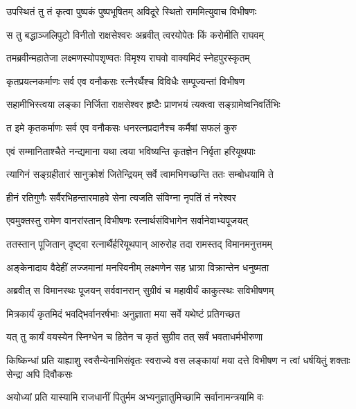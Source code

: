 
\twolineshloka
{उपस्थितं तु तं कृत्वा पुष्पकं पुष्पभूषितम्}
{अविदूरे स्थितो राममित्युवाच विभीषणः} %

\twolineshloka
{स तु बद्धाञ्जलिपुटो विनीतो राक्षसेश्वरः}
{अब्रवीत् त्वरयोपेतः किं करोमीति राघवम्} %

\twolineshloka
{तमब्रवीन्महातेजा लक्ष्मणस्योपशृण्वतः}
{विमृश्य राघवो वाक्यमिदं स्नेहपुरस्कृतम्} %

\twolineshloka
{कृतप्रयत्नकर्माणः सर्व एव वनौकसः}
{रत्नैरर्थैश्च विविधैः सम्पूज्यन्तां विभीषण} %

\twolineshloka
{सहामीभिस्त्वया लङ्का निर्जिता राक्षसेश्वर}
{हृष्टैः प्राणभयं त्यक्त्वा सङ्ग्रामेष्वनिवर्तिभिः} %

\twolineshloka
{त इमे कृतकर्माणः सर्व एव वनौकसः}
{धनरत्नप्रदानैश्च कर्मैषां सफलं कुरु} %

\twolineshloka
{एवं सम्मानिताश्चैते नन्द्यमाना यथा त्वया}
{भविष्यन्ति कृतज्ञेन निर्वृता हरियूथपाः} %

\twolineshloka
{त्यागिनं सङ्ग्रहीतारं सानुक्रोशं जितेन्द्रियम्}
{सर्वे त्वामभिगच्छन्ति ततः सम्बोधयामि ते} %

\twolineshloka
{हीनं रतिगुणैः सर्वैरभिहन्तारमाहवे}
{सेना त्यजति संविग्ना नृपतिं तं नरेश्वर} %

\twolineshloka
{एवमुक्तस्तु रामेण वानरांस्तान् विभीषणः}
{रत्नार्थसंविभागेन सर्वानेवाभ्यपूजयत्} %

\twolineshloka
{ततस्तान् पूजितान् दृष्ट्वा रत्नार्थैर्हरियूथपान्}
{आरुरोह तदा रामस्तद् विमानमनुत्तमम्} %

\twolineshloka
{अङ्केनादाय वैदेहीं लज्जमानां मनस्विनीम्}
{लक्ष्मणेन सह भ्रात्रा विक्रान्तेन धनुष्मता} %

\twolineshloka
{अब्रवीत् स विमानस्थः पूजयन् सर्ववानरान्}
{सुग्रीवं च महावीर्यं काकुत्स्थः सविभीषणम्} %

\twolineshloka
{मित्रकार्यं कृतमिदं भवद्भिर्वानरर्षभाः}
{अनुज्ञाता मया सर्वे यथेष्टं प्रतिगच्छत} %

\twolineshloka
{यत् तु कार्यं वयस्येन स्निग्धेन च हितेन च}
{कृतं सुग्रीव तत् सर्वं भवताधर्मभीरुणा} %

\threelineshloka
{किष्किन्धां प्रति याह्याशु स्वसैन्येनाभिसंवृतः}
{स्वराज्ये वस लङ्कायां मया दत्ते विभीषण}
{न त्वां धर्षयितुं शक्ताः सेन्द्रा अपि दिवौकसः} %

\twolineshloka
{अयोध्यां प्रति यास्यामि राजधानीं पितुर्मम}
{अभ्यनुज्ञातुमिच्छामि सर्वानामन्त्रयामि वः} %

